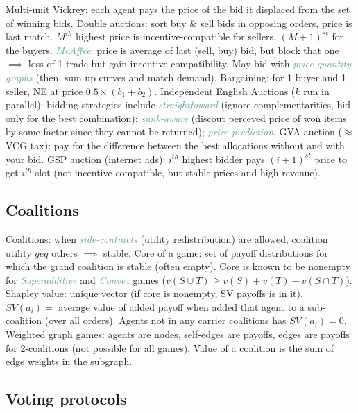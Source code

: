 \documentclass[10pt,a4paper,landscape]{article}
\newcommand{\concept}[1]{\textcolor{Emerald}{#1}} %
\newcommand{\subconcept}[1]{\textcolor{CadetBlue}{\textit{#1}}}
\begin{document}
\begin{multicols*}{4}
\concept{Multi-unit Vickrey}: each agent pays the price of the bid it displaced from the set of winning bids.
\concept{Double auctions}: sort buy \& sell bids in opposing orders, price is last match. $M^{th}$ highest price is incentive-compatible for sellers, $(M+1)^{st}$ for the buyers. \subconcept{McAffee}: price is average of last (sell, buy) bid, but block that one $\implies$ loss of 1 trade but gain incentive compatibility. May bid with \subconcept{price-quantity graphs} (then, sum up curves and match demand).
\concept{Bargaining}: for 1 buyer and 1 seller, NE at price $0.5 \times (b_1 + b_2)$.
\concept{Independent English Auctions} ($k$ run in parallel): bidding strategies include \subconcept{straightfoward} (ignore complementarities, bid only for the best combination); \subconcept{sunk-aware} (discout perceved price of won items by some factor since they cannot be returned); \subconcept{price prediction}.
\concept{GVA auction} ($\approx$ VCG tax): pay for the difference between the best allocations without and with your bid.
\concept{GSP auction} (internet ads): $i^{th}$ highest bidder pays $(i+1)^{st}$ price to get $i^{th}$ slot (not incentive compatible, but stable prices and high revenue).

\subsection{Coalitions}

\concept{Coalitions}: when \subconcept{side-contracts} (utility redistribution) are allowed, coalition utility $geq$ others $\implies$ stable.
\concept{Core} of a game: set of payoff distributions for which the grand coalition is stable (often empty).
Core is known to be nonempty for \subconcept{Superadditive} and \subconcept{Convex} games ($v(S \cup T) \geq v(S) + v(T) - v(S \cap T)$).
\concept{Shapley value}: unique vector (if core is nonempty, SV payoffs is in it). $SV(a_i) = $ average value of added payoff when added that agent to a sub-coalition (over all orders). Agents not in any carrier coalitions has $SV(a_i) = 0$.
\concept{Weighted graph games}: agents are nodes, self-edges are payoffs, edges are payoffs for 2-coalitions (not possible for all games). Value of a coalition is the sum of edge weights in the subgraph.

\subsection{Voting protocols}


\end{multicols*}
\end{document}
